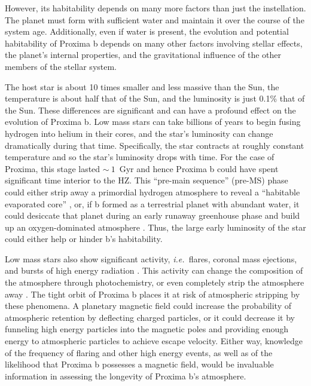 \documentclass[preprint,12pt]{aastex}
\def\eg{{\it e.g.\ }}
\def\ie{{\it i.e.\ }}
\begin{document}
However, its habitability depends on many more factors than just the
instellation. The planet must form with sufficient water and maintain
it over the course of the system age. Additionally, even if water is present,
the evolution and potential habitability of Proxima b depends on many
other factors involving stellar effects, the planet's internal properties, and the
gravitational influence of the other members of the stellar system.

The host star is about 10 times smaller and less massive than the Sun,
the temperature is about half that of the Sun, and the luminosity is
just 0.1\% that of the Sun. These differences are significant and can
have a profound effect on the evolution of Proxima b. Low mass stars
can take billions of years to begin fusing hydrogen into helium in
their cores, and the star's luminosity can change dramatically during that
time. Specifically, the star contracts at roughly constant temperature and so
the star's luminosity drops with time. For the case of Proxima, this
stage lasted $\sim~1$~Gyr \citep{Baraffe15} and hence Proxima b
could have spent significant time interior to the HZ. This ``pre-main sequence'' (pre-MS) phase could
either strip away a primordial hydrogen atmosphere to reveal a
``habitable evaporated core'' \citep{Luger15}, or, if b formed as a
terrestrial planet with abundant water, it could desiccate that planet during an early runaway greenhouse phase and build up an
oxygen-dominated atmosphere \citep{LugerBarnes15}. Thus, the large
early luminosity of the star could either help or hinder
b's habitability.

Low mass stars also show significant activity, \ie flares, coronal
mass ejections, and bursts of high energy radiation
\citep[\eg][]{West08}. This activity can change the composition of the
atmosphere through photochemistry, or even completely strip the
atmosphere away \citep{Raymond06}. The tight orbit of Proxima b places
it at risk of atmospheric stripping by these phenomena. A planetary
magnetic field could increase the probability of atmospheric retention
by deflecting charged particles, or it could decrease it by funneling
high energy particles into the magnetic poles and providing enough
energy to atmospheric particles to achieve escape velocity. Either
way, knowledge of the frequency of flaring and other high energy
events, as well as of the likelihood that Proxima b possesses a
magnetic field, would be invaluable information in assessing the
longevity of Proxima b's atmosphere.
\end{document}
